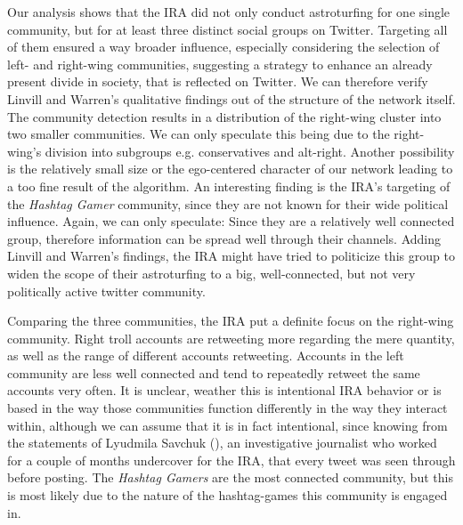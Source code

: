 \documentclass[12pt, titlepage=true, toc=bib]{scrartcl}
\begin{document}
Our analysis shows that the IRA did not only conduct astroturfing for one single community, but for at least three distinct social groups on Twitter. Targeting all of them ensured a way broader influence, especially considering the selection of left- and right-wing communities, suggesting a strategy to enhance an already present divide in society, that is reflected on Twitter. We can therefore verify Linvill and Warren's qualitative findings out of the structure of the network itself. The community detection results in a distribution of the right-wing cluster into two smaller communities. We can only speculate this being due to the right-wing's division into subgroups e.g. conservatives and alt-right. Another possibility is the relatively small size or the ego-centered character of our network leading to a too fine result of the algorithm. An interesting finding is the IRA's targeting of the \textit{Hashtag Gamer} community, since they are not known for their wide political influence. Again, we can only speculate: Since they are a relatively well connected group, therefore information can be spread well through their channels. Adding Linvill and Warren's findings, the IRA might have tried to politicize this group to widen the scope of their astroturfing to a big, well-connected, but not very politically active twitter community.

Comparing the three communities, the IRA put a definite focus on the right-wing community. Right troll accounts are retweeting more regarding the mere quantity, as well as the range of different accounts retweeting. Accounts in the left community are less well connected and tend to repeatedly retweet the same accounts very often. It is unclear, weather this is intentional IRA behavior or is based in the way those communities function differently in the way they interact within, although we can assume that it is in fact intentional, since knowing from the statements of Lyudmila Savchuk (\cite{savchuk_inside_2018}), an investigative journalist who worked for a couple of months undercover for the IRA, that every tweet was seen through before posting. The \textit{Hashtag Gamers} are the most connected community, but this is most likely due to the nature of the hashtag-games this community is engaged in.
\end{document}
